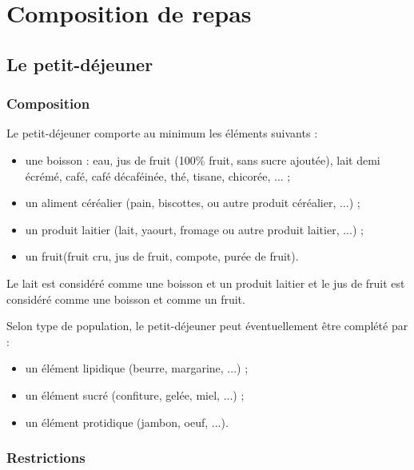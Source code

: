 \chapter{Composition de repas}

\section{Le petit-déjeuner}

\subsection{Composition}

Le petit-déjeuner comporte au minimum les éléments suivants :
\begin{itemize}
	\item une boisson : eau, jus de fruit (100\% fruit, sans sucre ajoutée), lait demi écrémé, café, café décaféinée, thé, tisane, chicorée, ... ;
	\item un aliment céréalier (pain, biscottes, ou autre produit céréalier, ...) ;
	\item un produit laitier (lait, yaourt, fromage ou autre produit laitier, ...) ;
	\item un fruit(fruit cru, jus de fruit, compote, purée de fruit).
\end{itemize}

Le lait est considéré comme une boisson et un produit laitier et le jus de fruit est considéré comme une boisson et comme un fruit.

Selon type de population, le petit-déjeuner peut éventuellement être complété par :
\begin{itemize}
	\item un élément lipidique (beurre, margarine, ...) ;
	\item un élément sucré (confiture, gelée, miel, ...) ;
	\item un élément protidique (jambon, oeuf, ...).
\end{itemize}

\subsection{Restrictions}

